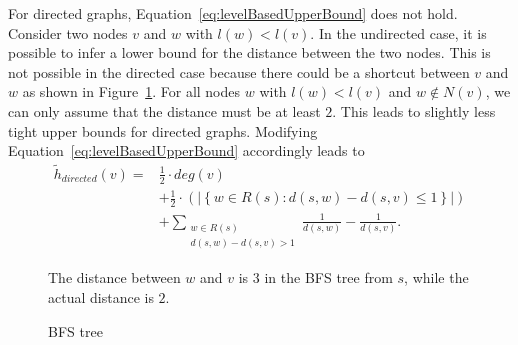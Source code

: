 For directed graphs, Equation~\ref{eq:levelBasedUpperBound} does not hold. Consider two nodes $v$ and $w$ with $l(w) < l(v)$. In the undirected case, it is possible to infer a lower bound for the distance between the two nodes. This is not possible in the directed case because there could be a shortcut between $v$ and $w$ as shown in Figure~\ref{fig:directedBFSbound}. For all nodes $w$ with $l(w) < l(v)$ and $w \notin N(v)$, we can only assume that the distance must be at least $2$. This leads to slightly less tight upper bounds for directed graphs. Modifying Equation~\ref{eq:levelBasedUpperBound} accordingly leads to
\begin{align}
     \widetilde{h}_{directed}(v) ={} &\frac{1}{2} \cdot deg(v) \nonumber \\
      &+ \frac{1}{2} \cdot \left( \left|\left\{ w \in R(s) : d(s, w) - d(s, v) \leq 1 \right\} \right| \right) \nonumber \\
      &+ \sum_{\substack{w \in R(s) \\ d(s, w) - d(s, v) > 1}}{\frac{1}{d(s, w)} - \frac{1}{d(s, v)}}. \label{eq:levelBasedUpperBoundDirected} 
\end{align}



\begin{figure}[h!]
\centering
{}
\caption{BFS tree}{The distance between $w$ and $v$ is $3$ in the BFS tree from $s$, while the actual distance is $2$.}
\label{fig:directedBFSbound}
\end{figure}

